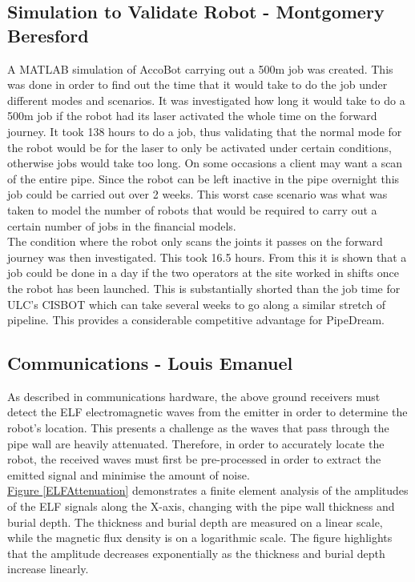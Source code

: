 \documentclass[11pt]{article}		%
\newcommand{\figref}[1]{\hyperref[#1]{Figure \ref*{#1}}}    %
\begin{document}
			
	    \subsection[Simulation to Validate Robot]{Simulation to Validate Robot - Montgomery Beresford}
	        
	   A MATLAB simulation of AccoBot carrying out a 500m job was created. This was done in order to find out the time that it would take to do the job under different modes and scenarios. 
	   It was investigated how long it would take to do a 500m job if the robot had its laser activated the whole time on the forward journey. It took 138 hours to do a job, thus validating that the normal mode for the robot would be for the laser to only be activated under certain conditions, otherwise jobs would take too long. On some occasions a client may want a scan of the entire pipe. Since the robot can be left inactive in the pipe overnight this job could be carried out over 2 weeks. This worst case scenario was what was taken to model the number of robots that would be required to carry out a certain number of jobs in the financial models.
	   \\
	   The condition where the robot only scans the joints it passes on the forward journey was then investigated. This took 16.5 hours. From this it is shown that a job could be done in a day if the two operators at the site worked in shifts once the robot has been launched. This is substantially shorted than the job time for ULC's CISBOT which can take several weeks to go along a similar stretch of pipeline. This provides a considerable competitive advantage for PipeDream.
	   
	        


       		
		\subsection[Communications]{Communications - Louis Emanuel}
		
			As described in communications hardware, the above ground receivers must detect the ELF electromagnetic waves from the emitter in order to determine the robot's location.
			This presents a challenge as the waves that pass through the pipe wall are heavily attenuated. 
			Therefore, in order to accurately locate the robot, the received waves must first be pre-processed in order to extract the emitted signal and minimise the amount of noise.
			\\
		    \hspace*{3ex}\figref{ELFAttenuation}  demonstrates a finite element analysis of the amplitudes of the ELF signals along the X-axis, changing with the pipe wall thickness and burial depth.
		    The thickness and burial depth are measured on a linear scale, while the magnetic flux density is on a logarithmic scale.
		    The figure highlights that the amplitude decreases exponentially as the thickness and burial depth increase linearly.
		    
\end{document}
